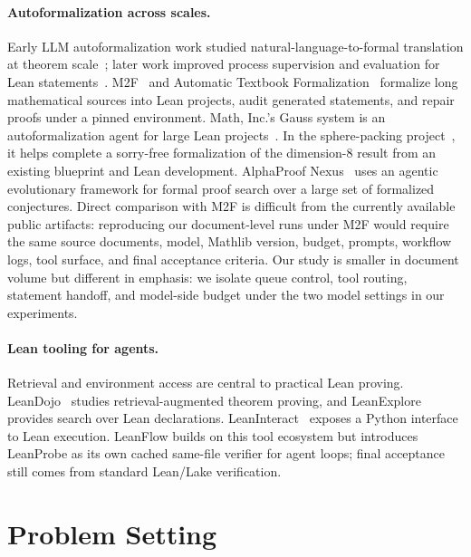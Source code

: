 \documentclass{article}
\newcommand{\method}{LeanFlow\xspace}
\newcommand{\lean}{Lean\xspace}
\newcommand{\mathlib}{Mathlib\xspace}
\begin{document}
\paragraph{Autoformalization across scales.}
Early LLM autoformalization work studied natural-language-to-formal translation at theorem scale~\citep{wu2022autoformalization}; later work improved process supervision and evaluation for \lean statements~\citep{lu2024process,poiroux2024reliable,poiroux2025rlmeval}.
M2F~\citep{wang2026m2f} and Automatic Textbook Formalization~\citep{gloeckle2026automatictextbookformalization} formalize long mathematical sources into \lean projects, audit generated statements, and repair proofs under a pinned environment.
Math, Inc.'s Gauss system is an autoformalization agent for large \lean projects~\citep{mathinc2025gauss}. In the sphere-packing project~\citep{hariharan2026milestoneformalizationspherepacking}, it helps complete a sorry-free formalization of the dimension-8 result from an existing blueprint and \lean development.
AlphaProof Nexus~\citep{tsoukalas2026advancingmathematicsresearchaidriven} uses an agentic evolutionary framework for formal proof search over a large set of formalized conjectures.
Direct comparison with M2F is difficult from the currently available public artifacts: reproducing our document-level runs under M2F would require the same source documents, model, \mathlib version, budget, prompts, workflow logs, tool surface, and final acceptance criteria.
Our study is smaller in document volume but different in emphasis: we isolate queue control, tool routing, statement handoff, and model-side budget under the two model settings in our experiments.

\paragraph{Lean tooling for agents.}
Retrieval and environment access are central to practical \lean proving.
LeanDojo~\citep{yang2023leandojo} studies retrieval-augmented theorem proving, and LeanExplore~\citep{asher2025leanexplore} provides search over \lean declarations.
LeanInteract~\citep{leaninteract2025} exposes a Python interface to \lean execution.
\method builds on this tool ecosystem but introduces LeanProbe as its own cached same-file verifier for agent loops; final acceptance still comes from standard \lean/Lake verification.

\section{Problem Setting}
\end{document}

